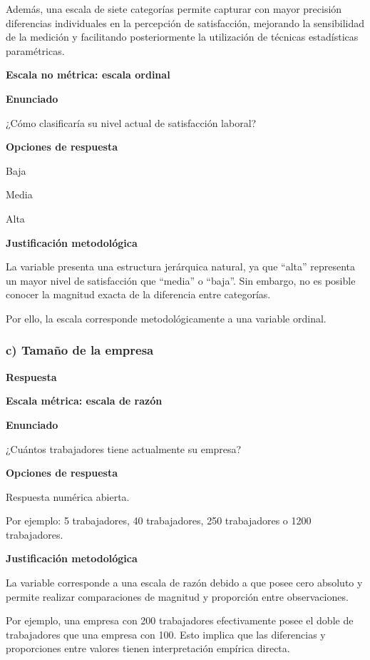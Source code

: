 \documentclass[12pt,letterpaper]{article}
\begin{document}
Además, una escala de siete categorías permite capturar con mayor precisión diferencias individuales en la percepción de satisfacción, mejorando la sensibilidad de la medición y facilitando posteriormente la utilización de técnicas estadísticas paramétricas.

\textbf{Escala no métrica: escala ordinal}

\textbf{Enunciado}

¿Cómo clasificaría su nivel actual de satisfacción laboral?

\textbf{Opciones de respuesta}

\begin{opciones}
\item Baja
\item Media
\item Alta
\end{opciones}

\textbf{Justificación metodológica}

La variable presenta una estructura jerárquica natural, ya que ``alta'' representa un mayor nivel de satisfacción que ``media'' o ``baja''. Sin embargo, no es posible conocer la magnitud exacta de la diferencia entre categorías.

Por ello, la escala corresponde metodológicamente a una variable ordinal.

\subsubsection*{c) Tamaño de la empresa}

\textbf{Respuesta}

\textbf{Escala métrica: escala de razón}

\textbf{Enunciado}

¿Cuántos trabajadores tiene actualmente su empresa?

\textbf{Opciones de respuesta}

Respuesta numérica abierta.

Por ejemplo: 5 trabajadores, 40 trabajadores, 250 trabajadores o 1200 trabajadores.

\textbf{Justificación metodológica}

La variable corresponde a una escala de razón debido a que posee cero absoluto y permite realizar comparaciones de magnitud y proporción entre observaciones.

Por ejemplo, una empresa con 200 trabajadores efectivamente posee el doble de trabajadores que una empresa con 100. Esto implica que las diferencias y proporciones entre valores tienen interpretación empírica directa.
\end{document}
